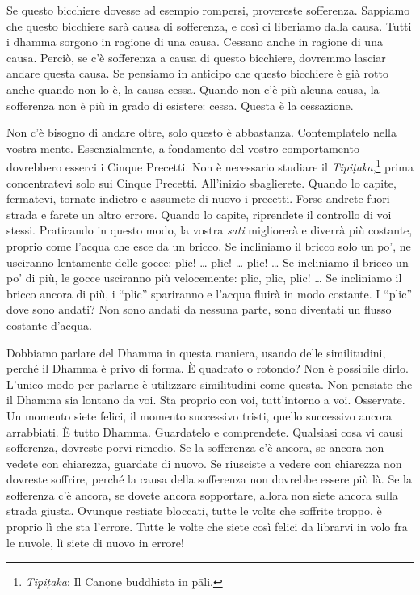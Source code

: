 Se questo bicchiere dovesse ad esempio rompersi, provereste sofferenza.
Sappiamo che questo bicchiere sarà causa di sofferenza, e così ci
liberiamo dalla causa. Tutti i dhamma sorgono in ragione di una
causa. Cessano anche in ragione di una causa. Perciò, se c'è sofferenza
a causa di questo bicchiere, dovremmo lasciar andare questa causa. Se
pensiamo in anticipo che questo bicchiere è già rotto anche quando non
lo è, la causa cessa. Quando non c'è più alcuna causa, la sofferenza non
è più in grado di esistere: cessa. Questa è la cessazione.

Non c'è bisogno di andare oltre, solo questo è abbastanza. Contemplatelo
nella vostra mente. Essenzialmente, a fondamento del vostro
comportamento dovrebbero esserci i Cinque Precetti. Non è necessario
studiare il \emph{Tipiṭaka},\footnote{\emph{Tipiṭaka}: Il Canone
  buddhista in pāli.} prima concentratevi solo sui Cinque Precetti.
All'inizio sbaglierete. Quando lo capite, fermatevi, tornate indietro e
assumete di nuovo i precetti. Forse andrete fuori strada e farete un
altro errore. Quando lo capite, riprendete il controllo di voi stessi.
Praticando in questo modo, la vostra \emph{sati} migliorerà e diverrà
più costante, proprio come l'acqua che esce da un bricco. Se incliniamo
il bricco solo un po', ne usciranno lentamente delle gocce: plic! \ldots{}
plic! \ldots{} plic! \ldots{} Se incliniamo il bricco un po' di più, le gocce
usciranno più velocemente: plic, plic, plic! \ldots{} Se incliniamo il bricco
ancora di più, i ``plic'' spariranno e l'acqua fluirà in modo costante.
I ``plic'' dove sono andati? Non sono andati da nessuna parte, sono
diventati un flusso costante d'acqua.

Dobbiamo parlare del Dhamma in questa maniera, usando delle
similitudini, perché il Dhamma è privo di forma. È quadrato o rotondo?
Non è possibile dirlo. L'unico modo per parlarne è utilizzare
similitudini come questa. Non pensiate che il Dhamma sia lontano da voi.
Sta proprio con voi, tutt'intorno a voi. Osservate. Un momento siete
felici, il momento successivo tristi, quello successivo ancora
arrabbiati. È tutto Dhamma. Guardatelo e comprendete. Qualsiasi cosa vi
causi sofferenza, dovreste porvi rimedio. Se la sofferenza c'è ancora,
se ancora non vedete con chiarezza, guardate di nuovo. Se riusciste a
vedere con chiarezza non dovreste soffrire, perché la causa della
sofferenza non dovrebbe essere più là. Se la sofferenza c'è ancora, se
dovete ancora sopportare, allora non siete ancora sulla strada giusta.
Ovunque restiate bloccati, tutte le volte che soffrite troppo, è proprio
lì che sta l'errore. Tutte le volte che siete così felici da librarvi in
volo fra le nuvole, lì siete di nuovo in errore!

